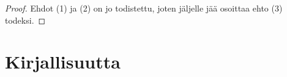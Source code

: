 \documentclass[12pt]{article}
\theoremstyle{definition}
\theoremstyle{plain}
\numberwithin{equation}{section}
\begin{document}
\begin{proof}
Ehdot (1) ja (2) on jo todistettu, joten jäljelle jää osoittaa ehto (3) todeksi. 
\end{proof}
\newline

\newpage
\section{Kirjallisuutta}
\onehalfspacing
[1] 
\newline
[2]
\newline
[3]
\newline
[4]
\end{document}
